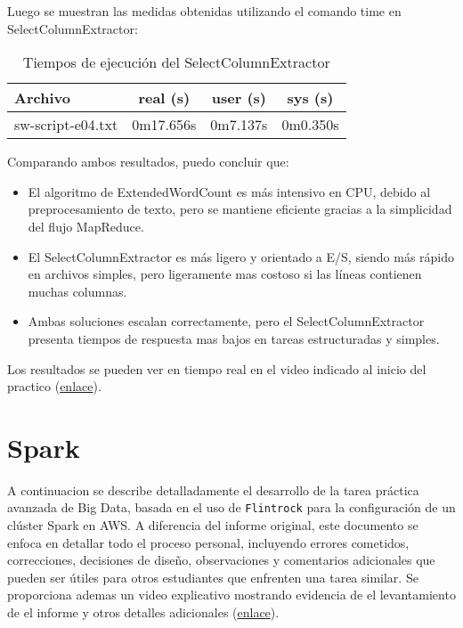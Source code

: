 \documentclass[12pt,letterpaper,twoside]{article}
\begin{document}
\noindent
Luego se muestran las medidas obtenidas utilizando el comando time en SelectColumnExtractor:

\begin{table}[h!]
\centering
\begin{tabular}{lccc}
\toprule
\textbf{Archivo} & \textbf{real (s)} & \textbf{user (s)} & \textbf{sys (s)} \\
\midrule
sw-script-e04.txt  & 0m17.656s  & 0m7.137s & 0m0.350s
\bottomrule
\end{tabular}
\caption{Tiempos de ejecución del SelectColumnExtractor}
\end{table}

\noindent
Comparando ambos resultados, puedo concluir que:
\begin{itemize}
    \item El algoritmo de ExtendedWordCount es más intensivo en CPU, debido al preprocesamiento de texto, pero se mantiene eficiente gracias a la simplicidad del flujo MapReduce.
    \item El SelectColumnExtractor es más ligero y orientado a E/S, siendo más rápido en archivos simples, pero ligeramente mas costoso si las líneas contienen muchas columnas.
    \item Ambas soluciones escalan correctamente, pero el SelectColumnExtractor presenta tiempos de respuesta mas bajos en tareas estructuradas y simples.
\end{itemize}

\noindent
Los resultados se pueden ver en tiempo real en el video indicado al inicio del practico ({\color{blue}\href{https://github.com/apache/hadoop}{enlace}}).

\newpage

\section{Spark}

A continuacion se describe detalladamente el desarrollo de la tarea práctica avanzada de Big Data, basada en el uso de \texttt{Flintrock} para la configuración de un clúster Spark en AWS. 
A diferencia del informe original, este documento se enfoca en detallar todo el proceso personal, incluyendo errores cometidos, correcciones, decisiones de diseño, observaciones y comentarios 
adicionales que pueden ser útiles para otros estudiantes que enfrenten una tarea similar. Se proporciona ademas un video explicativo mostrando evidencia de el levantamiento de el informe y otros
detalles adicionales ({\color{blue}\href{https://www.youtube.com/watch?v=cp5aBbUCwiQ}{enlace}}).
\end{document}
